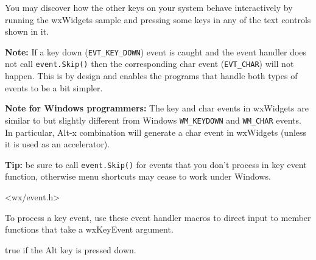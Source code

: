 You may discover how the other keys on your system behave interactively by
running the  wxWidgets sample and pressing some keys
in any of the text controls shown in it.

{\bf Note:} If a key down ({\tt EVT\_KEY\_DOWN}) event is caught and
the event handler does not call {\tt event.Skip()} then the corresponding
char event ({\tt EVT\_CHAR}) will not happen.  This is by design and
enables the programs that handle both types of events to be a bit
simpler.

{\bf Note for Windows programmers:} The key and char events in wxWidgets are
similar to but slightly different from Windows {\tt WM\_KEYDOWN} and
{\tt WM\_CHAR} events. In particular, Alt-x combination will generate a char
event in wxWidgets (unless it is used as an accelerator).

{\bf Tip:} be sure to call {\tt event.Skip()} for events that you don't process in
key event function, otherwise menu shortcuts may cease to work under Windows.




<wx/event.h>


To process a key event, use these event handler macros to direct input to member
functions that take a wxKeyEvent argument.

\twocolwidtha{7cm}
\begin{twocollist}\itemsep=0pt
\end{twocollist}%




\label{wxkeyeventmaltdown}


true if the Alt key is pressed down.


\label{wxkeyeventmcontroldown}


